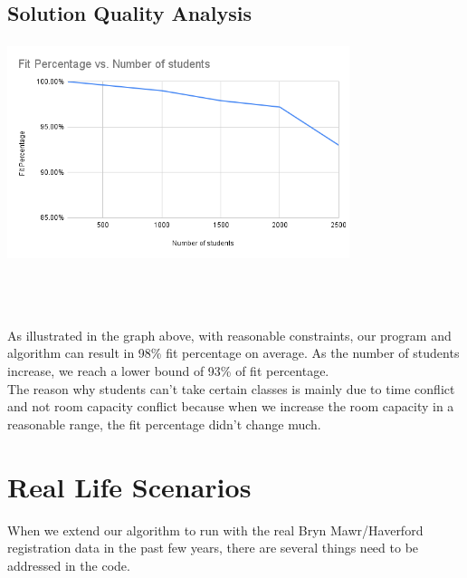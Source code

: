 \documentclass[11pt, oneside]{article}   	%
\begin{document}
\subsection{Solution Quality Analysis}

\centerline{\includegraphics[width=10cm, height=6.4cm]{Fit Percentage vs. Number of students (1).png}}\\\

As illustrated in the graph above, with reasonable constraints, our program and algorithm can result in 98\% fit percentage on average. As the number of students increase, we reach a lower bound of 93\% of fit percentage.  \\

The reason why students can't take certain classes is mainly due to time conflict and not room capacity conflict because when we increase the room capacity in a reasonable range, the fit percentage didn't change much. 


\section{Real Life Scenarios}
When we extend our algorithm to run with the real Bryn Mawr/Haverford registration data in the past few years, there are several things need to be addressed in the code. 
\end{document}
